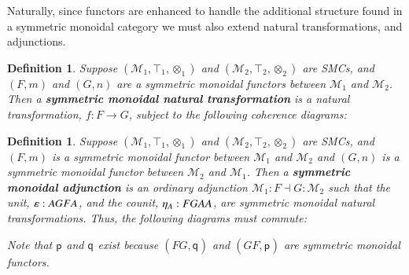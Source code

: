 \documentclass{lmcs}
\newtheorem{definition}[theorem]{Definition}
\let\mto\to
\let\to\relax
\newcommand{\to}{\rightarrow}
\newcommand{\cat}[1]{\mathcal{#1}}
\newcommand{\p}[1]{\mathsf{p}_{#1}}
\newcommand{\q}[1]{\mathsf{q}_{#1}}
\begin{document}
Naturally, since functors are enhanced to handle the additional
structure found in a symmetric monoidal category we must also extend
natural transformations, and adjunctions.
\begin{definition}
  \label{def:SMCNAT}
  Suppose $(\cat{M}_1,\top_1,\otimes_1)$ and $(\cat{M}_2,\top_2,\otimes_2)$
  are SMCs, and $(F,m)$ and $(G,n)$ are a symmetric monoidal functors
  between $\cat{M}_1$ and $\cat{M}_2$.  Then a \textbf{symmetric
    monoidal natural transformation} is a natural transformation,
  $f : F \mto G$, subject to the following coherence diagrams:
\end{definition}  
\begin{definition}
  \label{def:SMCADJ}
  Suppose $(\cat{M}_1,\top_1,\otimes_1)$ and $(\cat{M}_2,\top_2,\otimes_2)$
  are SMCs, and $(F,m)$ is a symmetric monoidal functor between
  $\cat{M}_1$ and $\cat{M}_2$ and $(G,n)$ is a symmetric monoidal
  functor between $\cat{M}_2$ and $\cat{M}_1$.  Then a
  \textbf{symmetric monoidal adjunction} is an ordinary adjunction
  $\cat{M}_1 : F \dashv G : \cat{M}_2$ such that the unit,
  $\varepsilon : A \to GFA$, and the counit, $\eta_A : FGA \to A$, are
  symmetric monoidal natural transformations.  Thus, the following
  diagrams must commute:
  Note that $\p{}$ and $\q{}$ exist because $(FG,\q{})$ and
  $(GF,\p{})$ are symmetric monoidal functors.
\end{definition}
\end{document}
